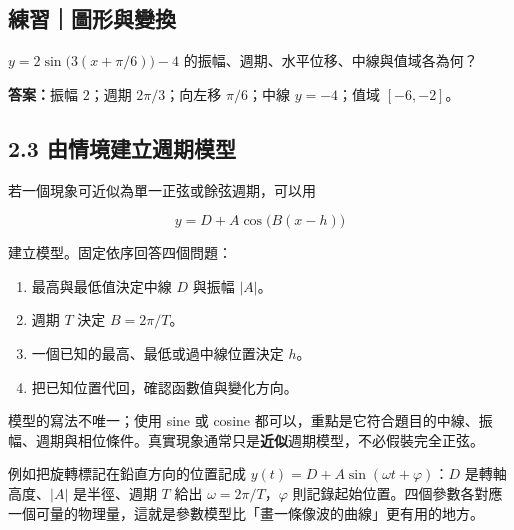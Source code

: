 \documentclass[11pt,a4paper]{article}
\providecommand{\tightlist}{%
  \setlength{\itemsep}{0pt}\setlength{\parskip}{0pt}}
\begin{document}
\begin{HandoutSelfCheck}

\subsection{練習｜圖形與變換}\label{ux7df4ux7fd2ux5716ux5f62ux8207ux8b8aux63db}

\(y=2\sin\bigl(3(x+\pi/6)\bigr)-4\) 的振幅、週期、水平位移、中線與值域各為何？

\textbf{答案：}振幅 \(2\)；週期 \(2\pi/3\)；向左移 \(\pi/6\)；中線 \(y=-4\)；值域 \([-6,-2]\)。

\end{HandoutSelfCheck}

\subsection{2.3 由情境建立週期模型}\label{ux7531ux60c5ux5883ux5efaux7acbux9031ux671fux6a21ux578b}

若一個現象可近似為單一正弦或餘弦週期，可以用

\[
y=D+A\cos\bigl(B(x-h)\bigr)
\]

建立模型。固定依序回答四個問題：

\begin{enumerate}
\def\labelenumi{\arabic{enumi}.}
\tightlist
\item
  最高與最低值決定中線 \(D\) 與振幅 \(|A|\)。
\item
  週期 \(T\) 決定 \(B=2\pi/T\)。
\item
  一個已知的最高、最低或過中線位置決定 \(h\)。
\item
  把已知位置代回，確認函數值與變化方向。
\end{enumerate}

模型的寫法不唯一；使用 sine 或 cosine 都可以，重點是它符合題目的中線、振幅、週期與相位條件。真實現象通常只是\textbf{近似}週期模型，不必假裝完全正弦。

例如把旋轉標記在鉛直方向的位置記成 \(y(t)=D+A\sin(\omega t+\varphi)\)：\(D\) 是轉軸高度、\(|A|\) 是半徑、週期 \(T\) 給出 \(\omega=2\pi/T\)，\(\varphi\) 則記錄起始位置。四個參數各對應一個可量的物理量，這就是參數模型比「畫一條像波的曲線」更有用的地方。
\end{document}
